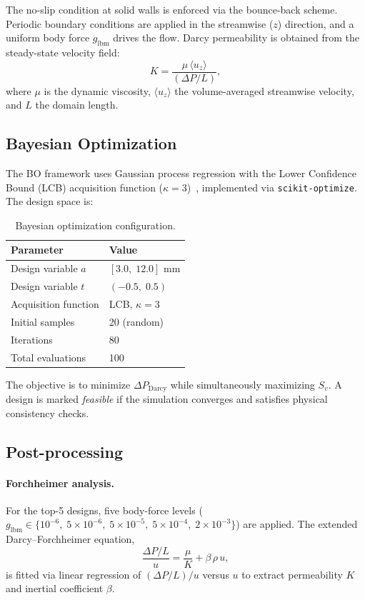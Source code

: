The no-slip condition at solid walls is enforced via the bounce-back scheme.
Periodic boundary conditions are applied in the streamwise ($z$) direction,
and a uniform body force $g_\mathrm{lbm}$ drives the flow.
Darcy permeability is obtained from the steady-state velocity field:
\begin{equation}\label{eq:darcy}
  K = \frac{\mu \, \langle u_z \rangle}{(\Delta P / L)},
\end{equation}
where $\mu$ is the dynamic viscosity, $\langle u_z \rangle$ the
volume-averaged streamwise velocity, and $L$ the domain length.

\subsection{Bayesian Optimization}\label{sec:bo}

The BO framework uses Gaussian process regression with the
Lower Confidence Bound (LCB) acquisition function
($\kappa = 3$)~\cite{ref_bo_lcb}, implemented via
\texttt{scikit-optimize}.  The design space is:

\begin{table}[htbp]
\caption{Bayesian optimization configuration.}\label{tab:bo_config}
\centering
\begin{tabular}{@{}ll@{}}
\toprule
Parameter & Value \\
\midrule
Design variable $a$ & $[\num{3.0},\; \num{12.0}]$ \si{\milli\meter} \\
Design variable $t$ & $(-0.5,\; 0.5)$ \\
Acquisition function & LCB, $\kappa = 3$ \\
Initial samples & 20 (random) \\
Iterations & 80 \\
Total evaluations & 100 \\
\bottomrule
\end{tabular}
\end{table}

The objective is to minimize $\Delta P_\mathrm{Darcy}$
while simultaneously maximizing $S_v$.
A design is marked \emph{feasible} if the simulation converges
and satisfies physical consistency checks.

\subsection{Post-processing}\label{sec:postproc}

\paragraph{Forchheimer analysis.}
For the top-5 designs, five body-force levels
($g_\mathrm{lbm} \in \{10^{-6},\; 5{\times}10^{-6},\; 5{\times}10^{-5},\;
5{\times}10^{-4},\; 2{\times}10^{-3}\}$) are applied.
The extended Darcy--Forchheimer equation,
\begin{equation}\label{eq:forch}
  \frac{\Delta P / L}{u} = \frac{\mu}{K} + \beta\,\rho\,u,
\end{equation}
is fitted via linear regression of $(\Delta P/L)/u$ versus $u$
to extract permeability $K$ and inertial coefficient $\beta$.


